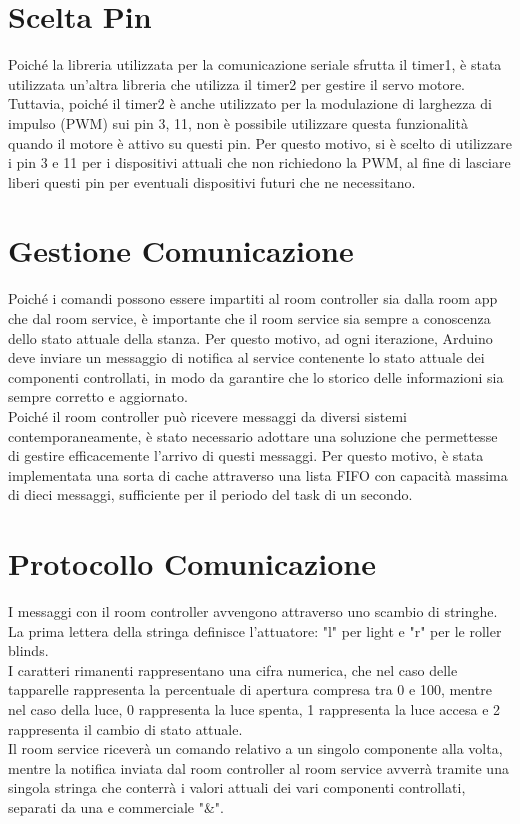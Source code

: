 \documentclass[a4paper]{report}
\begin{document}
\section{Scelta Pin}
Poiché la libreria utilizzata per la comunicazione seriale sfrutta il timer1, è stata utilizzata un'altra libreria che utilizza il timer2 per gestire il servo motore.\\
Tuttavia, poiché il timer2 è anche utilizzato per la modulazione di larghezza di impulso (PWM) sui pin 3, 11, non è possibile utilizzare questa funzionalità quando il motore è attivo su questi pin. Per questo motivo, si è scelto di utilizzare i pin 3 e 11 per i dispositivi attuali che non richiedono la PWM, al fine di lasciare liberi questi pin per eventuali dispositivi futuri che ne necessitano.
\section{Gestione Comunicazione}
Poiché i comandi possono essere impartiti al room controller sia dalla room app che dal room service, è importante che il room service sia sempre a conoscenza dello stato attuale della stanza. Per questo motivo, ad ogni iterazione, Arduino deve inviare un messaggio di notifica al service contenente lo stato attuale dei componenti controllati, in modo da garantire che lo storico delle informazioni sia sempre corretto e aggiornato.\\
Poiché il room controller può ricevere messaggi da diversi sistemi contemporaneamente, è stato necessario adottare una soluzione che permettesse di gestire efficacemente l'arrivo di questi messaggi. 
Per questo motivo, è stata implementata una sorta di cache attraverso una lista FIFO con capacità massima di dieci messaggi, sufficiente per il periodo del task di un secondo.
\newpage

\section{Protocollo Comunicazione}
I messaggi con il room controller avvengono attraverso uno scambio di stringhe. La prima lettera della stringa definisce l'attuatore: "l" per light e "r" per le roller blinds.\\
I caratteri rimanenti rappresentano una cifra numerica, che nel caso delle tapparelle rappresenta la percentuale di apertura compresa tra 0 e 100, mentre nel caso della luce, 0 rappresenta la luce spenta, 1 rappresenta la luce accesa e 2 rappresenta il cambio di stato attuale.\\
Il room service riceverà un comando relativo a un singolo componente alla volta, mentre la notifica inviata dal room controller al room service avverrà tramite una singola stringa che conterrà i valori attuali dei vari componenti controllati, separati da una e commerciale "\&".
\end{document}
